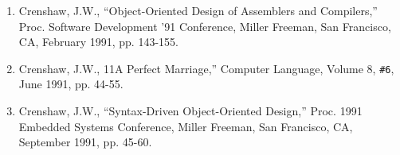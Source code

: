 \begin{enumerate}
\item	Crenshaw, J.W., ``Object-Oriented Design of Assemblers and Compilers,'' Proc. Software Development '91 Conference, Miller Freeman, San Francisco, CA, February 1991, pp. 143-155.
\item	Crenshaw, J.W., 11A Perfect Marriage,'' Computer Language, Volume 8, \verb|#6|, June 1991, pp. 44-55.
\item 	Crenshaw, J.W., ``Syntax-Driven Object-Oriented Design,'' Proc. 1991 Embedded Systems Conference, Miller Freeman, San Francisco, CA, September 1991, pp. 45-60.
\end{enumerate}
